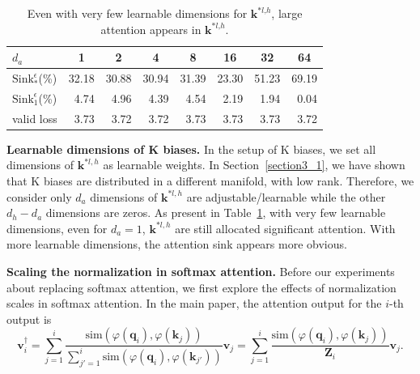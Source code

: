 \documentclass{article} \usepackage{iclr2025_conference,times}
\begin{document}
\begin{table}[htbp]
\vspace{-0.2cm}
\caption{Even with very few learnable dimensions for $\boldsymbol{k}^{*l\textrm{,}h}$, large attention appears in $\boldsymbol{k}^{*l\textrm{,}h}$.}
\vspace{-.4cm}
\begin{center}
\begin{tabular}{l|ccccccc}
\toprule
$d_a$ & 1 & 2 & 4 & 8 & 16 & 32  & 64  \\
\midrule
$\textrm{Sink}_{*}^{\epsilon}$(\%) & 32.18 & 30.88 & 30.94 & 31.39 & 23.30 & 51.23 &  69.19 \\
$\textrm{Sink}_{1}^{\epsilon}$(\%) & \,\,\,4.74 &  \,\,\,4.96 & \,\,\,4.39 & \,\,\,4.54 & \,\,\,2.19 & \,\,\,1.94 & \,\,\,0.04 \\
valid loss & \,\,\,3.73 & \,\,\,3.72 & \,\,\,3.72 & \,\,\,3.73 & \,\,\,3.73 & \,\,\,3.73 & \,\,\,3.72 \\
\bottomrule
\end{tabular}
\end{center}
\vspace{-.4cm}
\label{k_low_rank}
\end{table}

\textbf{Learnable dimensions of K biases.} In the setup of K biases, we set all dimensions of $\boldsymbol{k}^{*l\textrm{,}\,h}$ as learnable weights. In Section~\ref{section3_1}, we have shown that K biases are distributed in a different manifold, with low rank. Therefore, we consider only $d_a$ dimensions of $\boldsymbol{k}^{*l\textrm{,}\,h}$ are adjustable/learnable while the other $d_h-d_a$ dimensions are zeros. As present in Table~\ref{k_low_rank}, with very few learnable dimensions, even for $d_a=\textrm{1}$, $\boldsymbol{k}^{*l\textrm{,}\,h}$ are still allocated significant attention. With more learnable dimensions, the attention sink appears more obvious. 

\textbf{Scaling the normalization in softmax attention.} Before our experiments about replacing softmax attention, we first explore the effects of normalization scales in softmax attention. In the main paper, the attention output for the $i$-th output is
\begin{equation}
\boldsymbol{v}_i^{\dagger}=\sum_{j=1}^i\frac{\textrm{sim}(\varphi(\boldsymbol{q}_i)\textrm{,}\,\varphi(\boldsymbol{k}_j))}{\sum_{j'=1}^i\textrm{sim}(\varphi(\boldsymbol{q}_i)\textrm{,}\,\varphi(\boldsymbol{k}_{j'}))}\boldsymbol{v}_j=\sum_{j=1}^i\frac{\textrm{sim}(\varphi(\boldsymbol{q}_i)\textrm{,}\,\varphi(\boldsymbol{k}_j))}{\boldsymbol{Z}_i}\boldsymbol{v}_j\textrm{.}
\end{equation}
\end{document}
